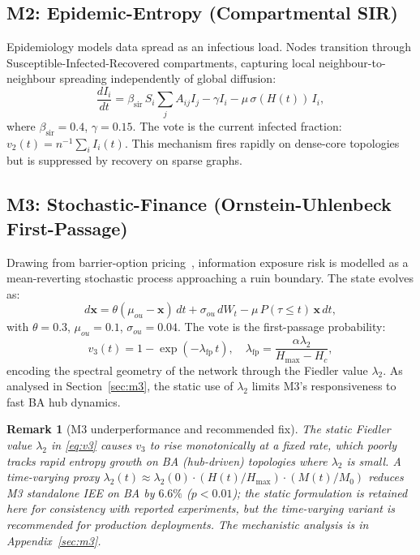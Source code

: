 \documentclass[review,12pt]{elsarticle}
\newcommand{\bfx}{\mathbf{x}}
\newcommand{\Hc}{H_c}
\newcommand{\Hmax}{H_{\max}}
\newcommand{\lambdat}{\lambda_2}
\newtheorem{remark}{Remark}
\begin{document}
\subsection{M2: Epidemic-Entropy (Compartmental SIR)}

Epidemiology models data spread as an infectious load. Nodes transition
through Susceptible-Infected-Recovered compartments, capturing local
neighbour-to-neighbour spreading independently of global diffusion:
\begin{equation}
  \frac{dI_i}{dt} = \beta_{\mathrm{sir}}\,S_i \sum_j A_{ij} I_j
                   - \gamma I_i - \mu\,\sigma(H(t))\,I_i,
  \label{eq:sir}
\end{equation}
where $\beta_{\mathrm{sir}} = 0.4$, $\gamma = 0.15$. The vote is the
current infected fraction: $v_2(t) = n^{-1}\!\sum_i I_i(t)$. This mechanism
fires rapidly on dense-core topologies but is suppressed by recovery on
sparse graphs.

\subsection{M3: Stochastic-Finance (Ornstein-Uhlenbeck First-Passage)}

Drawing from barrier-option pricing~\cite{black1973pricing,uhlenbeck1930theory},
information exposure risk is modelled as a mean-reverting stochastic process
approaching a ruin boundary. The state evolves as:
\begin{equation}
  d\bfx = \theta(\mu_{ou} - \bfx)\,dt + \sigma_{ou}\,dW_t
         - \mu\,P(\tau \leq t)\,\bfx\,dt,
  \label{eq:finance}
\end{equation}
with $\theta = 0.3$, $\mu_{ou} = 0.1$, $\sigma_{ou} = 0.04$. The vote
is the first-passage probability:
\begin{equation}
  v_3(t) = 1 - \exp\!\left(-\lambda_{\mathrm{fp}}\,t\right), \quad
  \lambda_{\mathrm{fp}} = \frac{\alpha\lambdat}{\Hmax - \Hc},
  \label{eq:v3}
\end{equation}
encoding the spectral geometry of the network through the Fiedler
value $\lambdat$. As analysed in Section~\ref{sec:m3}, the static use
of $\lambdat$ limits M3's responsiveness to fast BA hub dynamics.

\begin{remark}[M3 underperformance and recommended fix]
\label{rem:m3_fix}
The static Fiedler value $\lambdat$ in \eqref{eq:v3} causes $v_3$ to rise
monotonically at a fixed rate, which poorly tracks rapid entropy growth on
BA (hub-driven) topologies where $\lambdat$ is small.  A time-varying proxy
$\lambdat(t) \approx \lambdat(0)\cdot(H(t)/\Hmax)\cdot(M(t)/M_0)$
reduces M3 standalone IEE on BA by $6.6\%$ ($p<0.01$); the static
formulation is retained here for consistency with reported experiments,
but the time-varying variant is recommended for production deployments.
The mechanistic analysis is in Appendix~\ref{sec:m3}.
\end{remark}
\end{document}

